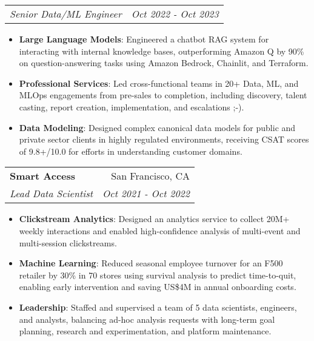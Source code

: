 \documentclass[letterpaper,11pt]{article}
\makeatletter
\newcommand{\resumeItem}[2]{
  \item\small{
    \textbf{#1}{: #2 \vspace{-2pt}}
  }
}
\newcommand{\resumeSubheading}[4]{
  \vspace{-1pt}\item
    \begin{tabular*}{0.97\textwidth}[t]{l@{\extracolsep{\fill}}r}
      \textbf{#1} & #2 \\
      \textit{\small#3} & \textit{\small #4} \\
    \end{tabular*}\vspace{-5pt}
}
\newcommand{\resumeSubSubheading}[2]{
    \begin{tabular*}{0.97\textwidth}{l@{\extracolsep{\fill}}r}
      \textit{\small#1} & \textit{\small #2} \\
    \end{tabular*}\vspace{-5pt}
}
\newcommand{\resumeSubHeadingListEnd}{\end{itemize}}
\newcommand{\resumeItemListStart}{\begin{itemize}}
\newcommand{\resumeItemListEnd}{\end{itemize}\vspace{-5pt}}
\makeatother
\begin{document}
   \resumeSubSubheading
    {Senior Data/ML Engineer}{Oct 2022 - Oct 2023}
    \resumeItemListStart
       \resumeItem{Large Language Models}
         {Engineered a chatbot RAG system for interacting with internal knowledge bases, outperforming Amazon Q by 90\% on question-answering tasks using Amazon Bedrock, Chainlit, and Terraform.}
       \resumeItem{Professional Services}
          {Led cross-functional teams in 20+ Data, ML, and MLOps engagements from pre-sales to completion, including discovery, talent casting, report creation, implementation, and escalations ;-).}
       \resumeItem{Data Modeling}
          {Designed complex canonical data models for public and private sector clients in highly regulated environments, receiving CSAT scores of 9.8+/10.0 for efforts in understanding customer domains.}
    \resumeItemListEnd

    \resumeSubheading
      {Smart Access}{San Francisco, CA}
      {Lead Data Scientist}{Oct 2021 - Oct 2022}
      \resumeItemListStart
        \resumeItem{Clickstream Analytics}
          {Designed an analytics service to collect 20M+ weekly interactions and enabled high-confidence analysis of multi-event and multi-session clickstreams.}
        \resumeItem{Machine Learning}
          {Reduced seasonal employee turnover for an F500 retailer by 30\% in 70 stores using survival analysis to predict time-to-quit, enabling early intervention and saving US\$4M in annual onboarding costs.}
        \resumeItem{Leadership}
          {Staffed and supervised a team of 5 data scientists, engineers, and analysts, balancing ad-hoc analysis requests with long-term goal planning, research and experimentation, and platform maintenance.}
      \resumeItemListEnd
\end{document}
